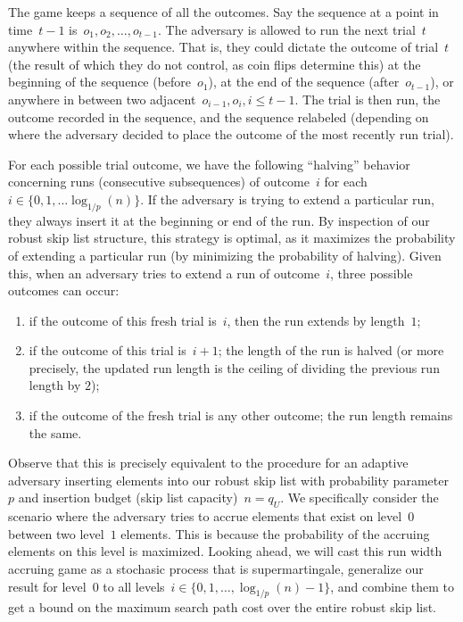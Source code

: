 The game keeps a sequence of all the outcomes. Say the sequence at a point in time~$t-1$ is~$o_1,o_2,\ldots,o_{t-1}$. The adversary is allowed to run the next trial~$t$ anywhere within the sequence. That is, they could dictate the outcome of trial~$t$ (the result of which they do not control, as coin flips determine this) at the beginning of the sequence (before~$o_1$), at the end of the sequence (after~$o_{t-1}$), or anywhere in between two adjacent~$o_{i-1},o_{i},i \leq t-1$. The trial is then run, the outcome recorded in the sequence, and the sequence relabeled (depending on where the adversary decided to place the outcome of the most recently run trial). 

For each possible trial outcome, we have the following ``halving'' behavior concerning runs (consecutive subsequences) of outcome~$i$ for each~$i \in \{0,1,\ldots \log_{1/p}(n)\}$. If the adversary is trying to extend a particular run, they always insert it at the beginning or end of the run. By inspection of our robust skip list structure, this strategy is optimal, as it maximizes the probability of extending a particular run (by minimizing the probability of halving). Given this, when an  adversary tries to extend a run of outcome~$i$, three possible outcomes can occur:

\begin{enumerate}
    \item if the outcome of this fresh trial is~$i$, then the run extends by length~$1$;
    \item if the outcome of this trial is~$i+1$;  the length of the run is halved (or more precisely, the updated run length is the ceiling of dividing the previous run length by $2$);
    \item if the outcome of the fresh trial is any other outcome; the run length remains the same. 
\end{enumerate}

Observe that this is precisely equivalent to the procedure for an adaptive adversary inserting elements into our robust skip list with probability parameter~$p$ and insertion budget (skip list capacity)~$n = q_U$. We specifically consider the scenario where the adversary tries to accrue elements that exist on level~$0$ between two level~$1$ elements. This is because the probability of the accruing elements on this level is maximized. Looking ahead, we will cast this run width accruing game as a stochasic process that is supermartingale, generalize our result for level~$0$ to all levels~$i \in \{0,1,\ldots,\log_{1/p}(n) - 1\}$, and combine them to get a bound on the maximum search path cost over the entire robust skip list.

